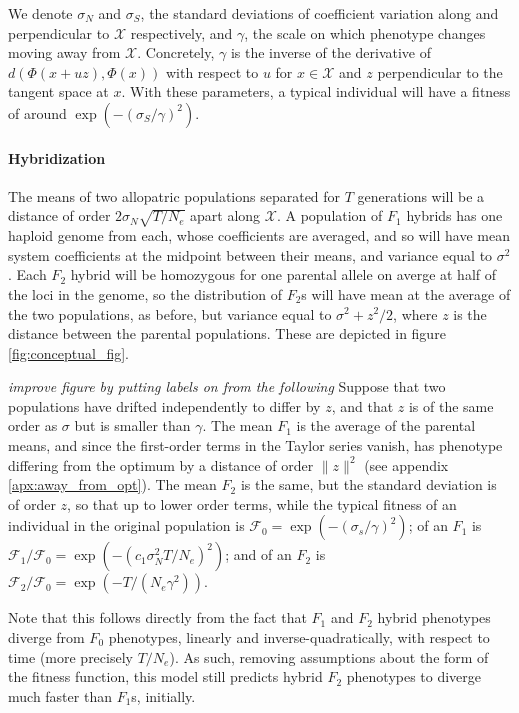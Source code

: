\documentclass{article}
\newcommand{\plr}[1]{\todo[color=blue!25]{#1}}
\newcommand{\plri}[1]{{\color{blue}\it #1}}
\newcommand{\plr}[1]{{\color{blue}\it #1}}
\newcommand{\plri}[1]{\plr{#1}}
\newcommand{\1}{\mathbbm{1}}
\newcommand{\fit}{\mathcal{F}}
\newcommand{\optx}{\mathcal{X}}
\newcommand{\dph}{d}
\begin{document}
We denote
$\sigma_N$ and $\sigma_S$, the standard deviations of coefficient variation along and perpendicular to $\optx$ respectively,
and $\gamma$, the scale on which phenotype changes moving away from $\optx$.
Concretely, $\gamma$ is the inverse of the derivative of $\dph(\Phi(x+u z), \Phi(x))$ 
with respect to $u$ for $x \in \optx$ and $z$ perpendicular to the tangent space at $x$.
With these parameters, a typical individual will have a fitness of around $\exp(-(\sigma_S/\gamma)^2)$.

\paragraph{Hybridization}
The means of two allopatric populations separated for $T$ generations
will be a distance of order $2\sigma_N \sqrt{T/N_e}$ apart along $\optx$.
A population of $F_1$ hybrids has one haploid genome from each,
whose coefficients are averaged,
and so will have mean system coefficients at the midpoint between their means,
and variance equal to $\sigma^2$. 
Each $F_2$ hybrid will be homozygous for one parental allele on averge at half of the loci in the genome,
so the distribution of $F_2$s will have mean at the average of the two populations,
as before,
but variance equal to $\sigma^2 + z^2/2$, where $z$ is the distance between the parental populations. 
These are depicted in figure \ref{fig:conceptual_fig}.


\plri{improve figure by putting labels on from the following}
Suppose that two populations have drifted independently to differ by $z$,
and that $z$ is of the same order as $\sigma$ but is smaller than $\gamma$.
The mean $F_1$ is the average of the parental means,
and since the first-order terms in the Taylor series vanish,
has phenotype differing from the optimum by a distance of order $\|z\|^2$ 
(see appendix \ref{apx:away_from_opt}).
The mean $F_2$ is the same,
but the standard deviation is of order $z$,
so that up to lower order terms, 
while the typical fitness of an individual in the original population is
$\fit_0 = \exp(-(\sigma_s/\gamma)^2)$;
of an $F_1$ is
$\fit_1/\fit_0 = \exp(-(c_1 \sigma_N^2 T/N_e)^2)$;
and of an $F_2$ is
$\fit_2/\fit_0 = \exp(- T/(N_e\gamma^2))$.

Note that this follows directly from the fact that $F_1$ and $F_2$ hybrid phenotypes diverge from $F_0$ phenotypes, linearly and inverse-quadratically, with respect to time (more precisely $T/N_e$). As such, removing assumptions about the form of the fitness function, this model still predicts hybrid $F_2$ phenotypes to diverge much faster than $F_1$s, initially.
\end{document}
